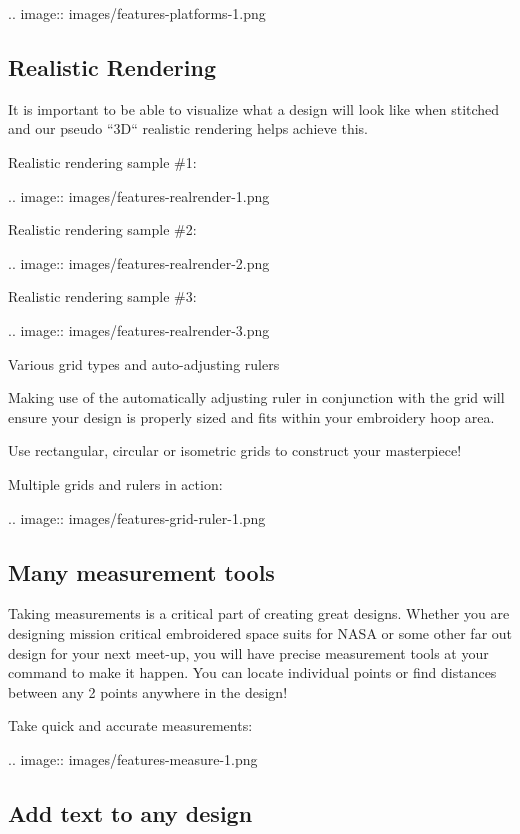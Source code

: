\documentclass[a4paper]{report}
\begin{document}
.. image::
   images/features-platforms-1.png

\subsection{Realistic Rendering}

It is important to be able to visualize what a design will look like when stitched and our pseudo ``3D`` realistic rendering helps achieve this.

Realistic rendering sample \#1:

.. image::
   images/features-realrender-1.png

Realistic rendering sample \#2:

.. image::
   images/features-realrender-2.png

Realistic rendering sample \#3:

.. image::
   images/features-realrender-3.png

Various grid types and auto-adjusting rulers

Making use of the automatically adjusting ruler in conjunction with the grid will ensure your design is properly sized and fits within your embroidery hoop area.

Use rectangular, circular or isometric grids to construct your masterpiece!

Multiple grids and rulers in action:

.. image::
   images/features-grid-ruler-1.png

\subsection{Many measurement tools}

Taking measurements is a critical part of creating great designs. Whether you are designing mission critical embroidered space suits for NASA or some other far out design for your next meet-up, you will have precise measurement tools at your command to make it happen. You can locate individual points or find distances between any 2 points anywhere in the design!

Take quick and accurate measurements:

.. image::
   images/features-measure-1.png

\subsection{Add text to any design}
\end{document}
